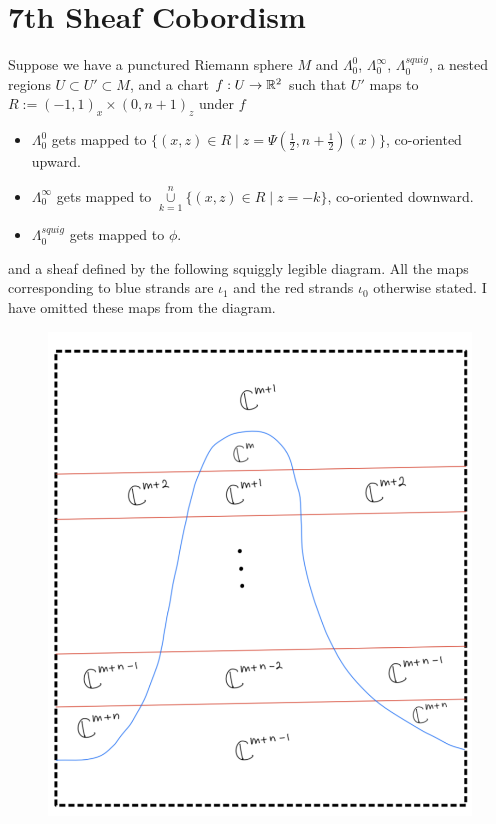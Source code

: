 \section{7th Sheaf Cobordism}
Suppose we have a punctured Riemann sphere $M$ and $\Lambda_0^0$, $\Lambda_0^\infty$, $\Lambda_0^{squig}$, a nested regions $U\subset U' \subset M$, and a chart $f : U \rightarrow \mathbb{R}^2$ such that $U'$ maps to $R:=(-1,1)_x \times (0,n+1)_z$ under $f$
\begin{itemize}
\item $\Lambda_0^0$ gets mapped to $\{(x,z)\in R \mid z=\Psi(\frac{1}{2},n+\frac{1}{2})(x)\}$, co-oriented upward.

\item $\Lambda_0^\infty$ gets mapped to $\overset{n}{\underset{k=1}{\cup}}\{(x,z)\in R \mid z=-k\}$, co-oriented downward.

\item $\Lambda_0^{squig}$ gets mapped to $\phi$.
\end{itemize}
and a sheaf defined by the following squiggly legible diagram. All the maps corresponding to blue strands are $\iota_1$ and the red strands $\iota_0$ otherwise stated. I have omitted these maps from the diagram.\\

\begin{figure}[H]
    \centering
    \includegraphics[scale = 0.95]{diagrams/cobord7/1.png}
    \caption{}
    \label{fig:your-label}
\end{figure}


